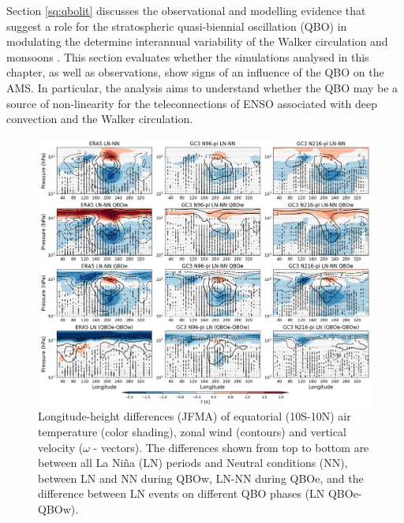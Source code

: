 Section \ref{sq:qbolit} discusses the observational and modelling evidence that suggest a role for  the stratospheric quasi-biennial oscillation (QBO) in modulating the determine interannual variability of the Walker circulation and monsoons \citep{giorgetta1999,collimore2003,liess2012}. 
This section evaluates whether the simulations analysed in this chapter, as well as observations, show signs of an influence of the QBO on the AMS. 
In particular, the analysis aims to understand whether the QBO may be a source of non-linearity for the teleconnections of ENSO associated with deep convection and the Walker circulation. %

\begin{figure}[b!]
\includegraphics[width=\linewidth]{figures/walker_wqbo_jfma}
\caption[Walker circulation responses to La Niña under different QBO phases] {Longitude-height differences (JFMA) of equatorial (10S-10N) air temperature (color shading), zonal wind (contours) and vertical velocity ($\omega$ - vectors). The differences shown from top to bottom are between all La Niña (LN) periods and Neutral conditions (NN), between LN and NN during QBOw, LN-NN during QBOe, and the difference between LN events on different QBO phases (LN QBOe-QBOw). 
}
\label{fig:qbowalker_pis}
\end{figure}

